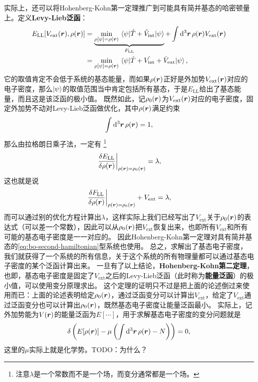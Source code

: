 \documentclass[hyperref, UTF8, a4paper]{ctexart}
\begin{document}
实际上，还可以将Hohenberg-Kohn第一定理推广到可能具有简并基态的哈密顿量上。定义\textbf{Levy-Lieb泛函}：
\begin{equation}
    \begin{aligned}
        E_\text{LL} [V_\text{ext}(\vb*{r}), \rho(\vb*{r})]  &= \underbrace{\min_{\rho[\psi]=\rho(\vb*{r})} \mel{\psi}{\hat{T} + \hat{V}_\text{int}}{\psi}}_{F_\text{LL}} + \int \dd[3]{\vb*{r}} \rho(\vb*{r}) V_\text{ext} (\vb*{r}) \\
        &= \min_{\rho[\psi]=\rho(\vb*{r})} \mel{\psi}{\hat{T} + \hat{V_\text{int}} + \hat{V}_\text{ext}}{\psi},
    \end{aligned}
    \label{eq:levy-lieb}
\end{equation}
它的取值肯定不会低于系统的基态能量，而如果$\rho(\vb*{r})$正好是外加势$V_\text{ext}(\vb*{r})$对应的电子密度，那么$\ket{\psi}$的取值范围当中肯定包括所有基态，于是$E_\text{LL}$给出了基态能量，而且这是该泛函的极小值。
既然如此，记$\rho_0(\vb*{r})$为$V_\text{ext}(\vb*{r})$对应的电子密度，固定外加势不动对Levy-Lieb泛函做优化，其中$\rho(\vb*{r})$满足约束
\[
    \int \dd[3]{\vb*{r}} \rho(\vb*{r}) = 1,
\]
那么由拉格朗日乘子法，一定有%
\footnote{注意$\lambda$是一个常数而不是一个场，而变分通常都是一个场。}%
\[
    \eval{\fdv{E_\text{LL}}{\rho(\vb*{r})}}_{\rho(\vb*{r}) = \rho_0 (\vb*{r})} = \lambda,
\]
这也就是说
\[
    \eval{\fdv{F_\text{LL}}{\rho(\vb*{r})}}_{\rho(\vb*{r}) = \rho_0(\vb*{r})} + V_\text{ext} = \lambda,
\]
而可以通过别的优化方程计算出$\lambda$，这样实际上我们已经写出了$V_\text{ext}$关于$\rho_0(\vb*{r})$的表达式（可以差一个常数），因此可以从$\rho_0(\vb*{r})$把$V_\text{ext}$恢复出来，也即所有$V_\text{ext}$和所有可能的基态电子密度是一一对应的。
因此Hohenberg-Kohn第一定理对具有简并基态的\eqref{eq:bo-second-hamiltonian}型系统也使用。
总之，求解出了基态电子密度，我们就获得了一个系统的所有信息，关于这个系统的所有物理量都可以通过基态电子密度的某个泛函计算出来。
一旦有了以上结论，\textbf{Hohenberg-Kohn第二定理}，也即，基态电子密度是固定了$V_\text{ext}$之后的Levy-Lieb泛函（此时称为\textbf{能量泛函}）的极小值，可以使用变分原理求出。
这个定理的证明只不过是把上面的论述倒过来使用而已：上面的论述表明给定$\rho_0(\vb*{r})$，通过泛函变分可以计算出$V_\text{ext}$，给定了$V_\text{ext}$通过泛函变分也可以计算出$\rho_0(\vb*{r})$，既然基态电子密度让能量泛函最小。
实际上，记外加势能为$V(\vb*{r})$的能量泛函为$E[\cdots]$，用于求解基态电子密度的变分问题就是
\begin{equation}
    \var \left( E[\rho(\vb*{r})] - \mu \left( \int \dd[3]{\vb*{r}} \rho(\vb*{r}) - N \right) \right) = 0,
    \label{eq:dft-variation-principle}
\end{equation}
这里的$\mu$实际上就是化学势。TODO：为什么？
\end{document}
